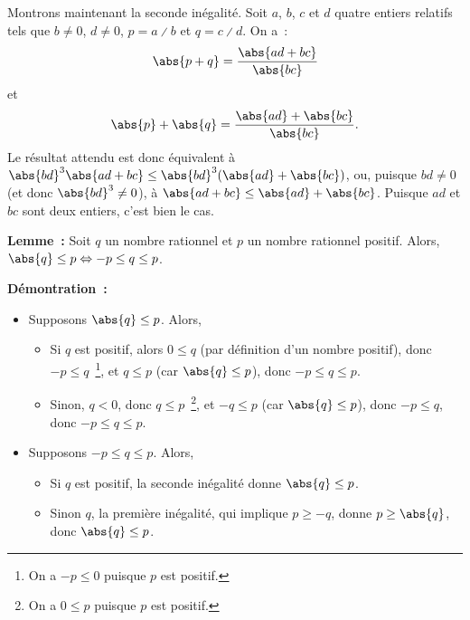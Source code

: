     Montrons maintenant la seconde inégalité. 
    Soit $a$, $b$, $c$ et $d$ quatre entiers relatifs tels que $b \neq 0$, $d \neq 0$, $p = a \divslash b$ et $q = c \divslash d$.
    On a : 
    \begin{equation*}
        \abs{p + q} = \frac{\abs{a d + b c}}{\abs{b c}}
    \end{equation*}
    et 
    \begin{equation*}
        \abs{p} + \abs{q} = \frac{\abs{a d} + \abs{b c}}{\abs{b c}} .
    \end{equation*}
    Le résultat attendu est donc équivalent à $\abs{b d}^3 \abs{a d + b c} \leq \abs{b d}^3 (\abs{a d} + \abs{b c})$, ou, puisque $b d \neq 0$ (et donc $\abs{b d}^3 \neq 0$), à $ \abs{a d + b c} \leq \abs{a d} + \abs{b c}$. 
    Puisque $a d$ et $b c$ sont deux entiers, c'est bien le cas.

    \done

\medskip

\noindent\textbf{Lemme :} Soit $q$ un nombre rationnel et $p$ un nombre rationnel positif. 
    Alors, $\abs{q} \leq p \Leftrightarrow -p \leq q \leq p$.

\medskip

\noindent\textbf{Démontration :} 
\begin{itemize}[nosep]
    \item Supposons $\abs{q} \leq p$. 
        Alors, 
        \begin{itemize}[nosep]
            \item Si $q$ est positif, alors $0 \leq q$ (par définition d'un nombre positif), donc $-p \leq q$~\footnote{On a $-p \leq 0$ puisque $p$ est positif.}, et $q \leq p$ (car $\abs{q} \leq p$), donc $-p \leq q \leq p$.
            \item Sinon, $q < 0$, donc $q \leq p$~\footnote{On a $0 \leq p$ puisque $p$ est positif.}, et $-q \leq p$ (car $\abs{q} \leq p$), donc $-p \leq q$, donc $-p \leq q \leq p$.
        \end{itemize}
    \item Supposons $-p \leq q \leq p$.
        Alors, 
        \begin{itemize}[nosep]
            \item Si $q$ est positif, la seconde inégalité donne $\abs{q} \leq p$.
            \item Sinon $q$, la première inégalité, qui implique $p \geq -q$, donne $p \geq \abs{q}$, donc $\abs{q} \leq p$.
        \end{itemize}
\end{itemize}

